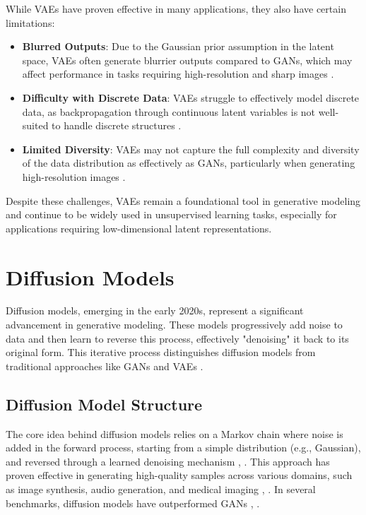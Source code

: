 While VAEs have proven effective in many applications, they also have certain limitations:
\begin{itemize}
    \item \textbf{Blurred Outputs}: Due to the Gaussian prior assumption in the latent space, VAEs often generate blurrier outputs compared to GANs, which may affect performance in tasks requiring high-resolution and sharp images \citep{10.1109/access.2020.2977671}.
    \item \textbf{Difficulty with Discrete Data}: VAEs struggle to effectively model discrete data, as backpropagation through continuous latent variables is not well-suited to handle discrete structures \citep{10.48550/arxiv.1909.13062}.
    \item \textbf{Limited Diversity}: VAEs may not capture the full complexity and diversity of the data distribution as effectively as GANs, particularly when generating high-resolution images \citep{10.48550/arxiv.2106.06500}.
\end{itemize}

Despite these challenges, VAEs remain a foundational tool in generative modeling and continue to be widely used in unsupervised learning tasks, especially for applications requiring low-dimensional latent representations.

\section{Diffusion Models}

Diffusion models, emerging in the early 2020s, represent a significant advancement in generative modeling. These models progressively add noise to data and then learn to reverse this process, effectively "denoising" it back to its original form. This iterative process distinguishes diffusion models from traditional approaches like GANs and VAEs \citep{10.48550/arxiv.2105.05233}.

\subsection{Diffusion Model Structure}

The core idea behind diffusion models relies on a Markov chain where noise is added in the forward process, starting from a simple distribution (e.g., Gaussian), and reversed through a learned denoising mechanism \citep{10.48550/arxiv.2009.09761}, \citep{10.48550/arxiv.2206.05564}. This approach has proven effective in generating high-quality samples across various domains, such as image synthesis, audio generation, and medical imaging \citep{10.48550/arxiv.2201.11972}, \citep{10.48550/arxiv.2211.00611}. In several benchmarks, diffusion models have outperformed GANs \citep{10.48550/arxiv.2105.05233}, \citep{10.48550/arxiv.2201.00308}.

